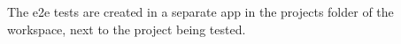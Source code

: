 The e2e tests are created in a separate app in the {\ttfamily projects} folder of the workspace, next to the project being tested. 